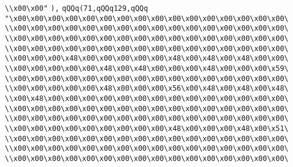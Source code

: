 \verb|\\x00\x00"|\newline
\verb|),|\newline
\verb|qQQq(71,qQQq129,qQQq|\newline
\verb|"\x00\x00\x00\x00\x00\x00\x00\x00\x00\x00\x00\x00\x00\x00\x00\x00\|\newline
\verb|\\x00\x00\x00\x00\x00\x00\x00\x00\x00\x00\x00\x00\x00\x00\x00\x00\|\newline
\verb|\\x00\x00\x00\x00\x00\x00\x00\x00\x00\x00\x00\x00\x00\x00\x00\x00\|\newline
\verb|\\x00\x00\x00\x00\x00\x00\x00\x00\x00\x00\x00\x00\x00\x00\x00\x00\|\newline
\verb|\\x00\x00\x00\x48\x00\x00\x00\x00\x00\x48\x00\x48\x00\x48\x00\x00\|\newline
\verb|\\x00\x00\x00\x00\x00\x48\x00\x48\x00\x00\x00\x48\x00\x00\x00\x59\|\newline
\verb|\\x00\x00\x00\x00\x00\x00\x00\x00\x00\x00\x00\x00\x00\x00\x00\x00\|\newline
\verb|\\x00\x00\x00\x00\x00\x48\x00\x00\x00\x56\x00\x48\x00\x48\x00\x48\|\newline
\verb|\\x00\x48\x00\x00\x00\x00\x00\x00\x00\x00\x00\x00\x00\x00\x00\x00\|\newline
\verb|\\x00\x00\x00\x00\x00\x00\x00\x00\x00\x00\x00\x00\x00\x00\x00\x00\|\newline
\verb|\\x00\x00\x00\x00\x00\x00\x00\x00\x00\x00\x00\x00\x00\x00\x00\x00\|\newline
\verb|\\x00\x00\x00\x00\x00\x00\x00\x00\x00\x48\x00\x00\x00\x48\x00\x51\|\newline
\verb|\\x00\x00\x00\x00\x00\x00\x00\x00\x00\x00\x00\x00\x00\x00\x00\x00\|\newline
\verb|\\x00\x00\x00\x00\x00\x00\x00\x00\x00\x00\x00\x00\x00\x00\x00\x00\|\newline
\verb|\\x00\x00\x00\x00\x00\x00\x00\x00\x00\x00\x00\x00\x00\x00\x00\x00\|\newline
